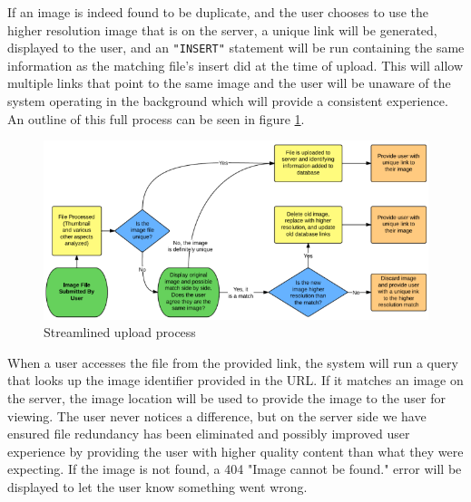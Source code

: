 \documentclass[11pt]{article}
\begin{document}
If an image is indeed found to be duplicate, and the user chooses to use the higher resolution image that is on the server, a unique link will be generated, displayed to the user, and an {\tt "INSERT"} statement will be run containing the same information as the matching file's insert did at the time of upload. This will allow multiple links that point to the same image and the user will be unaware of the system operating in the background which will provide a consistent experience. An outline of this full process can be seen in figure \ref{method-fig1}.

\begin{figure}[htbp]
\centering
\includegraphics[width=5in]{upprocess}
\caption{Streamlined upload process}
\label{method-fig1}
\end{figure}

When a user accesses the file from the provided link, the system will run a query that looks up the image identifier provided in the URL. If it matches an image on the server, the image location will be used to provide the image to the user for viewing. The user never notices a difference, but on the server side we have ensured file redundancy has been eliminated and possibly improved user experience by providing the user with higher quality content than what they were expecting. If the image is not found, a 404 "Image cannot be found." error will be displayed to let the user know something went wrong.

%
%
\end{document}
